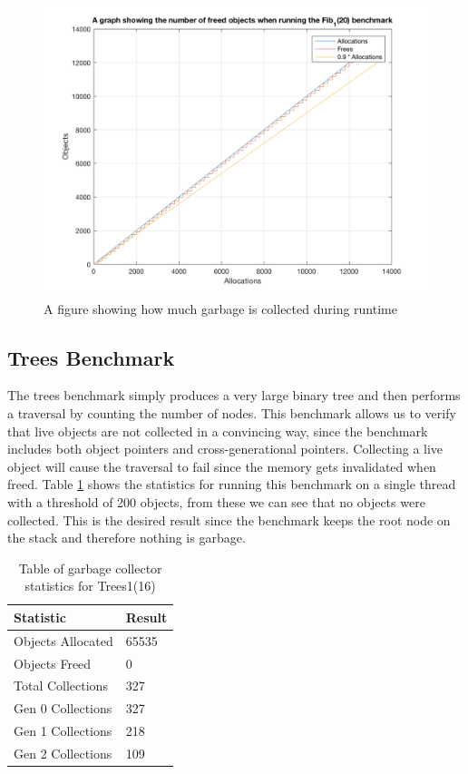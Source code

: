 \documentclass[../diss.tex]{subfiles}
\begin{document}
\begin{figure}
    \centering
    \includegraphics[max width=\linewidth]{figs/fibgarbage.png}
    \caption{A figure showing how much garbage is collected during runtime}
    \label{fig:fibgarbagegraph}
\end{figure}

\subsection{Trees Benchmark}

The trees benchmark simply produces a very large binary tree and then performs a traversal by counting the number of nodes. This benchmark allows us to verify that live objects are not collected in a convincing way, since the benchmark includes both object pointers and cross-generational pointers. Collecting a live object will cause the traversal to fail since the memory gets invalidated when freed. Table \ref{tab:trees1stats} shows the statistics for running this benchmark on a single thread with a threshold of 200 objects, from these we can see that no objects were collected. This is the desired result since the benchmark keeps the root node on the stack and therefore nothing is garbage.

\begin{table}
    \centering
    \begin{tabular}{| l | l |}
        \hline
         \bf{Statistic} & \bf{Result} \\ \hline
         Objects Allocated & 65535 \\ \hline
         Objects Freed & 0 \\ \hline
         Total Collections & 327 \\ \hline
         Gen 0 Collections & 327 \\ \hline
         Gen 1 Collections & 218 \\ \hline
         Gen 2 Collections & 109 \\ \hline
    \end{tabular}
    \caption{Table of garbage collector statistics for Trees1(16)}
    \label{tab:trees1stats}
\end{table}
\end{document}
